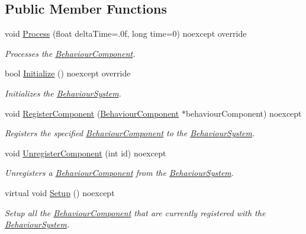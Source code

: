 \subsection*{Public Member Functions}
\begin{DoxyCompactItemize}
\item 
void \hyperlink{class_blade_1_1_behaviour_system_af233e62b0ee7a43a419069d6de557343}{Process} (float delta\+Time=.\+0f, long time=0) noexcept override
\begin{DoxyCompactList}\small\item\em Processes the \hyperlink{class_blade_1_1_behaviour_component}{Behaviour\+Component}. \end{DoxyCompactList}\item 
bool \hyperlink{class_blade_1_1_behaviour_system_ac4d601f2f88faf7deceb78e01ca8d6be}{Initialize} () noexcept override
\begin{DoxyCompactList}\small\item\em Initializes the \hyperlink{class_blade_1_1_behaviour_system}{Behaviour\+System}. \end{DoxyCompactList}\item 
void \hyperlink{class_blade_1_1_behaviour_system_aafcc2463979e3442abb93c086b4d0cbc}{Register\+Component} (\hyperlink{class_blade_1_1_behaviour_component}{Behaviour\+Component} $\ast$behaviour\+Component) noexcept
\begin{DoxyCompactList}\small\item\em Registers the specified \hyperlink{class_blade_1_1_behaviour_component}{Behaviour\+Component} to the \hyperlink{class_blade_1_1_behaviour_system}{Behaviour\+System}. \end{DoxyCompactList}\item 
void \hyperlink{class_blade_1_1_behaviour_system_a42ca453f54a399c8fb2a1e0010b3d318}{Unregister\+Component} (int id) noexcept
\begin{DoxyCompactList}\small\item\em Unregisters a \hyperlink{class_blade_1_1_behaviour_component}{Behaviour\+Component} from the \hyperlink{class_blade_1_1_behaviour_system}{Behaviour\+System}. \end{DoxyCompactList}\item 
\mbox{\label{class_blade_1_1_behaviour_system_ac7400258a6f5c8dd55231beaab6f04f7}} 
virtual void \hyperlink{class_blade_1_1_behaviour_system_ac7400258a6f5c8dd55231beaab6f04f7}{Setup} () noexcept
\begin{DoxyCompactList}\small\item\em Setup all the \hyperlink{class_blade_1_1_behaviour_component}{Behaviour\+Component} that are currently registered with the \hyperlink{class_blade_1_1_behaviour_system}{Behaviour\+System}. \end{DoxyCompactList}\item 

\end{DoxyCompactItemize}
